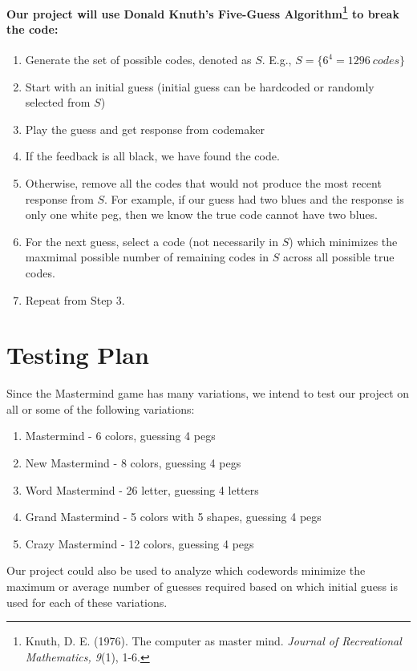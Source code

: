 \documentclass{article}
\begin{document}
\paragraph[]{Our project will use Donald Knuth's Five-Guess Algorithm\footnote{Knuth, D. E. (1976). The computer as master mind. \textit{Journal of Recreational Mathematics, 9}(1), 1-6.} to break the code:}

\begin{enumerate}
	\item Generate the set of possible codes, denoted as $S$. E.g., $S= \{ 6^4=1296 \ codes\}$
	\item Start with an initial guess (initial guess can be hardcoded or randomly selected from $S$) 
	\item Play the guess and get response from codemaker
	\item If the feedback is all black, we have found the code.
	\item Otherwise, remove all the codes that would not produce the most recent response from $S$. For example, if our guess had two blues and the response is only one white peg, then we know the true code cannot have two blues.
	\item For the next guess, select a code (not necessarily in $S$) which minimizes the maxmimal possible number of remaining codes in $S$ across all possible true codes.
	\item Repeat from Step 3.
\end{enumerate}

\section{Testing Plan}
Since the Mastermind game has many variations, we intend to test our project on all or some of the following variations:
\begin{enumerate}
	\item Mastermind - 6 colors, guessing 4 pegs 
	\item New Mastermind - 8 colors, guessing 4 pegs 
	\item Word Mastermind - 26 letter, guessing 4 letters
	\item Grand Mastermind - 5 colors with 5 shapes, guessing 4 pegs 
	\item Crazy Mastermind - 12 colors, guessing 4 pegs 

\end{enumerate}
Our project could also be used to analyze which codewords minimize the maximum or average number of guesses required based on which initial guess is used for each of these variations.
\end{document}
